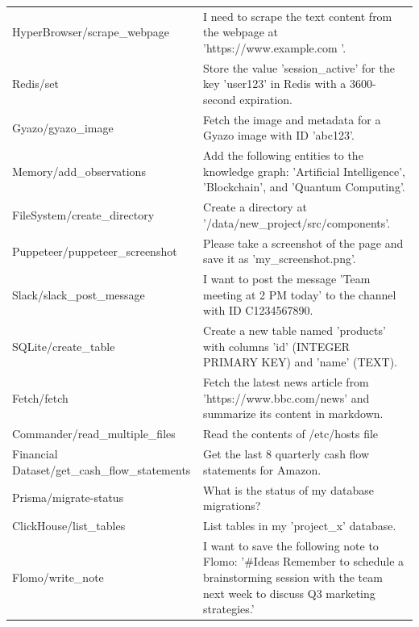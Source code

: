 \begin{center}
\begin{longtable}{@{}p{}p{}@{}}
HyperBrowser/scrape\_webpage & I need to scrape the text content from the webpage at 'https://www.example.com '. \\
Redis/set & Store the value 'session\_active' for the key 'user123' in Redis with a 3600-second expiration. \\
Gyazo/gyazo\_image & Fetch the image and metadata for a Gyazo image with ID 'abc123'. \\
Memory/add\_observations & Add the following entities to the knowledge graph: 'Artificial Intelligence', 'Blockchain', and 'Quantum Computing'. \\
FileSystem/create\_directory & Create a directory at '/data/new\_project/src/components'. \\
Puppeteer/puppeteer\_screenshot & Please take a screenshot of the page and save it as 'my\_screenshot.png'. \\
Slack/slack\_post\_message & I want to post the message 'Team meeting at 2 PM today' to the channel with ID C1234567890. \\
SQLite/create\_table & Create a new table named 'products' with columns 'id' (INTEGER PRIMARY KEY) and 'name' (TEXT). \\
Fetch/fetch & Fetch the latest news article from 'https://www.bbc.com/news' and summarize its content in markdown. \\
Commander/read\_multiple\_files & Read the contents of /etc/hosts file \\
Financial Dataset/get\_cash\_flow\_statements & Get the last 8 quarterly cash flow statements for Amazon. \\
Prisma/migrate-status & What is the status of my database migrations? \\
ClickHouse/list\_tables & List tables in my 'project\_x' database. \\
Flomo/write\_note & I want to save the following note to Flomo: '\#Ideas Remember to schedule a brainstorming session with the team next week to discuss Q3 marketing strategies.' \\
\bottomrule
\end{longtable}\end{center}
